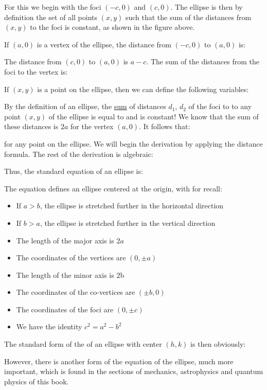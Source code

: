 \begin{enumerate}
		For this we begin with the foci $\left(-c,0\right)$ and $\left(c,0\right)$. The ellipse is then by definition the set of all points $\left(x,y\right)$ such that the sum of the distances from $\left(x,y\right)$ to the foci is constant, as shown in the figure above.
		
		If $\left(a,0\right)$ is a vertex of the ellipse, the distance from $\left(-c,0\right)$ to $\left(a,0\right)$ is:
		
		The distance from $\left(c,0\right)$ to $\left(a,0\right)$ is $a-c$. The sum of the distances from the foci to the vertex is:
		
		If $\left(x,y\right)$ is a point on the ellipse, then we can define the following variables:
		
		By the definition of an ellipse, the \underline{sum} of  distances ${d}_{1}$, ${d}_{2}$ of the foci to to any point $(x,y)$ of the ellipse is equal to  and is constant! We know that the sum of these distances is $2a$ for the vertex $(a,0)$. It follows that:
		
		for any point on the ellipse. We will begin the derivation by applying the distance formula. The rest of the derivation is algebraic:
		
		Thus, the standard equation of an ellipse is:
		
		The equation defines an ellipse centered at the origin, with for recall:
		\begin{itemize}
			\item If $a>b$, the ellipse is stretched further in the horizontal direction
			\item If $b>a$, the ellipse is stretched further in the vertical direction
			\item The length of the major axis is $2a$
			\item The coordinates of the vertices are $(0,\pm a)$
			\item The length of the minor axis is $2$b
			\item The coordinates of the co-vertices are $(\pm b,0)$
			\item The coordinates of the foci are $(0,\pm c)$
			\item We have the identity $c^2=a^2-b^2$
		\end{itemize}
		The standard form of the of an ellipse with center $(h,k)$ is then obviously:
		
	
		However, there is another form of the equation of the ellipse, much more important, which is found in the sections of mechanics, astrophysics and quantum physics of this book.
		

\end{enumerate}
